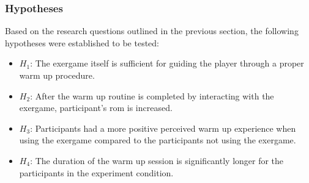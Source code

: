 \subsubsection{Hypotheses}
Based on the research questions outlined in the previous section, the following hypotheses were established to be tested: 
\begin{itemize}
\item \begin{math}H_{1}\end{math}: The exergame itself is sufficient for guiding the player through a proper warm up procedure.
\item \begin{math}H_{2}\end{math}: After the warm up routine is completed by interacting with the exergame, participant's \gls{rom} is increased.
\item \begin{math}H_{3}\end{math}: Participants had a more positive perceived warm up experience when using the exergame compared to the participants not using the exergame.  
\item \begin{math}H_{4}\end{math}: The duration of the warm up session is significantly longer for the participants in the experiment condition.
\end{itemize}
